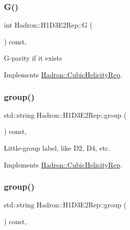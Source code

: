 \subsubsection{\texorpdfstring{G()}{G()}\hspace{0.1cm}{\footnotesize\ttfamily [3/3]}}
{\footnotesize\ttfamily int Hadron\+::\+H1\+D3\+E2\+Rep\+::G (\begin{DoxyParamCaption}{ }\end{DoxyParamCaption}) const\hspace{0.3cm}{\ttfamily [inline]}, {\ttfamily [virtual]}}

G-\/parity if it exists 

Implements \mbox{\hyperlink{structHadron_1_1CubicHelicityRep_a50689f42be1e6170aa8cf6ad0597018b}{Hadron\+::\+Cubic\+Helicity\+Rep}}.

\mbox{\label{structHadron_1_1H1D3E2Rep_aeb5e2d7d6d716039d61a8262627b7853}} 
\subsubsection{\texorpdfstring{group()}{group()}\hspace{0.1cm}{\footnotesize\ttfamily [1/5]}}
{\footnotesize\ttfamily std\+::string Hadron\+::\+H1\+D3\+E2\+Rep\+::group (\begin{DoxyParamCaption}{ }\end{DoxyParamCaption}) const\hspace{0.3cm}{\ttfamily [inline]}, {\ttfamily [virtual]}}

Little-\/group label, like D2, D4, etc. 

Implements \mbox{\hyperlink{structHadron_1_1CubicHelicityRep_a101a7d76cd8ccdad0f272db44b766113}{Hadron\+::\+Cubic\+Helicity\+Rep}}.

\mbox{\label{structHadron_1_1H1D3E2Rep_aeb5e2d7d6d716039d61a8262627b7853}} 
\subsubsection{\texorpdfstring{group()}{group()}\hspace{0.1cm}{\footnotesize\ttfamily [2/5]}}
{\footnotesize\ttfamily std\+::string Hadron\+::\+H1\+D3\+E2\+Rep\+::group (\begin{DoxyParamCaption}{ }\end{DoxyParamCaption}) const\hspace{0.3cm}{\ttfamily [inline]}, {\ttfamily [virtual]}}

